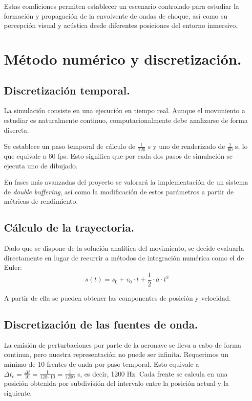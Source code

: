 \documentclass[10.5pt]{article}
\begin{document}
	Estas condiciones permiten establecer un escenario controlado para estudiar la formación y propagación de la envolvente de ondas de choque, así como su percepción visual y acústica desde diferentes posiciones del entorno inmersivo.
	
	\newpage 
	
	\section{Método numérico y discretización.}
	
	\subsection{Discretización temporal.}
	
	La simulación consiste en una ejecución en tiempo real. Aunque el movimiento a estudiar es naturalmente continuo, computacionalmente debe analizarse de forma discreta.
	
	Se establece un paso temporal de cálculo de $\frac{1}{120}$ s y uno de renderizado de $\frac{1}{60}$ s, lo que equivale a 60 fps. Esto significa que por cada dos pasos de simulación se ejecuta uno de dibujado. 
	
	En fases más avanzadas del proyecto se valorará la implementación de un sistema de \textit{double buffering}, así como la modificación de estos parámetros a partir de métricas de rendimiento. 
	
	\subsection{Cálculo de la trayectoria.}
	
	Dado que se dispone de la solución analítica del movimiento, se decide evaluarla directamente en lugar de recurrir a métodos de integración numérica como el de Euler:
	\begin{equation*}
		s(t) = s_0 + v_0 \cdot t + \frac{1}{2} \cdot a \cdot t^2
	\end{equation*} 
	
	A partir de ella se pueden obtener las componentes de posición y velocidad.
	
	\subsection{Discretización de las fuentes de onda.}
	
	La emisión de perturbaciones por parte de la aeronave se lleva a cabo de forma continua, pero nuestra representación no puede ser infinita.
	Requerimos un mínimo de 10 frentes de onda por paso temporal. Esto equivale a $\Delta t_e = \frac{\Delta t}{10} = \frac{1}{120 \cdot 10} = \frac{1}{1200}$ s, es decir, 1200 Hz. Cada frente se calcula en una posición obtenida por subdivisión del intervalo entre la posición actual y la siguiente.
	
\end{document}
